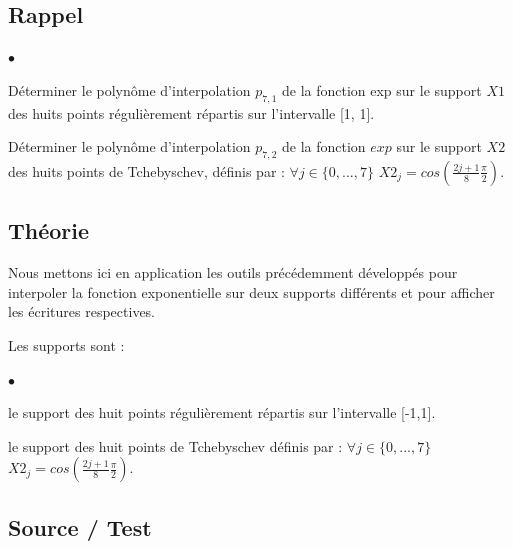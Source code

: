 \documentclass[a4paper,10pt]{report}
\begin{document}
\subsection*{Rappel}

\begin{list}{}{}
\item \begin{list}{$\bullet$}{}
\item Déterminer le polynôme d’interpolation $p_{7,1}$ de la fonction exp sur
le support $X1$ des huits points régulièrement répartis sur l’intervalle [1, 1].
\item Déterminer le polynôme d’interpolation $p_{7,2}$ de la fonction $exp$ sur le
support $X2$ des huits points de Tchebyschev, définis par : $\forall j \in \lbrace 0,...,7 \rbrace$  $X2_{j} = cos(\frac{2j+1}{8} \frac{\pi}{2}).$
\end{list}
\end{list}

\subsection*{Théorie}

Nous mettons ici en application les outils précédemment développés pour interpoler la fonction exponentielle sur deux supports différents et pour afficher les écritures respectives.

Les supports sont :
\begin{list}{}{}
\item \begin{list}{$\bullet$}{}
\item le support des huit points régulièrement répartis sur l’intervalle [-1,1].
\item le support des huit points de Tchebyschev définis par : $\forall j \in \lbrace 0,...,7 \rbrace$  $X2_{j} = cos(\frac{2j+1}{8} \frac{\pi}{2}).$

\end{list}
\end{list}

\newpage
\subsection*{Source / Test}

\begin{center}
	
\end{center}
\end{document}
